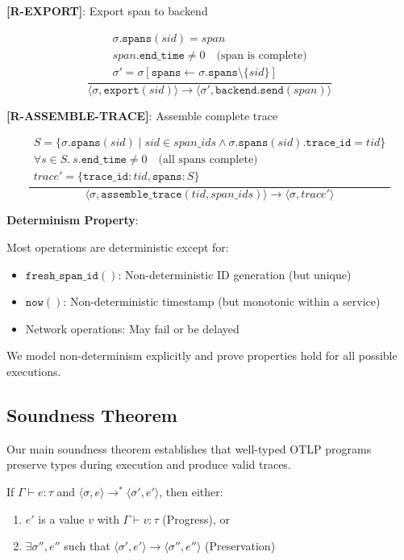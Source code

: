 \textbf{[R-EXPORT]}: Export span to backend

\[
\frac{\begin{array}{l}
      \sigma.\texttt{spans}(sid) = span \\
      span.\texttt{end\_time} \neq 0 \quad \text{(span is complete)} \\
      \sigma' = \sigma[\texttt{spans} \leftarrow \sigma.\texttt{spans} \setminus \{sid\}]
      \end{array}}
     {\langle\sigma, \texttt{export}(sid)\rangle \rightarrow \langle\sigma', \texttt{backend.send}(span)\rangle}
\]

\textbf{[R-ASSEMBLE-TRACE]}: Assemble complete trace

\[
\frac{\begin{array}{l}
      S = \{\sigma.\texttt{spans}(sid) \mid sid \in span\_ids \land \sigma.\texttt{spans}(sid).\texttt{trace\_id} = tid\} \\
      \forall s \in S.\ s.\texttt{end\_time} \neq 0 \quad \text{(all spans complete)} \\
      trace' = \{\texttt{trace\_id}: tid, \texttt{spans}: S\}
      \end{array}}
     {\langle\sigma, \texttt{assemble\_trace}(tid, span\_ids)\rangle \rightarrow \langle\sigma, trace'\rangle}
\]

\textbf{Determinism Property}:

Most operations are deterministic except for:

\begin{itemize}
\item $\texttt{fresh\_span\_id}()$: Non-deterministic ID generation (but unique)
\item $\texttt{now}()$: Non-deterministic timestamp (but monotonic within a service)
\item Network operations: May fail or be delayed
\end{itemize}

We model non-determinism explicitly and prove properties hold for all possible executions.

\subsection{Soundness Theorem}
\label{sec:soundness}

Our main soundness theorem establishes that well-typed OTLP programs preserve types during execution and produce valid traces.

\begin{theorem}
\label{thm:soundness}
If $\Gamma \vdash e : \tau$ and $\langle\sigma, e\rangle \rightarrow^* \langle\sigma', e'\rangle$, then either:
\begin{enumerate}
\item $e'$ is a value $v$ with $\Gamma \vdash v : \tau$ (Progress), or
\item $\exists \sigma'', e''$ such that $\langle\sigma', e'\rangle \rightarrow \langle\sigma'', e''\rangle$ (Preservation)
\end{enumerate}
\end{theorem}

